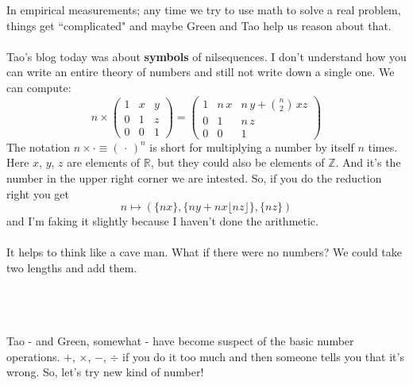 \documentclass[12pt]{article}
\begin{document}
\newpage

\noindent In empirical measurements; any time we try to use math to solve a real problem, things get ``complicated" and maybe Green and Tao help us reason about that. \\ \\
Tao's blog today was about \textbf{symbols} of nilsequences.  I don't understand how you can write an entire theory of numbers and still not write down a single one.  We can compute:
$$ n \times  \left( \begin{array}{ccc} 
1 & x & y \\ 0 & 1 & z \\ 0 & 0 & 1 \end{array} \right)
 = \left( \begin{array}{ccl} 
1 & n \, x & n\, y + \binom{n}{2} \, x z\\ 0 & 1 & n \, z \\ 0 & 0 & 1 \end{array} \right) $$
The notation $n \times \cdot \equiv (\,\cdot \,)^n$ is short for multiplying a number by itself $n$ times.  Here $x$, $y$, $z$ are elements of $\mathbb{R}$, but they could also be elements of $\mathbb{Z}$.  And it's the number in the upper right corner we are intested.  So, if you do the reduction right you get 
$$ n \mapsto ( \{ n x \} , \{ ny + nx \lfloor nz \rfloor \} , \{ n z\} ) $$
and I'm faking it slightly because I haven't done the arithmetic.  \\ \\
It helps to think like a cave man.  What if there were no numbers?  We could take two lengths and add them. \\ \\
 \\ \\
Tao - and Green, somewhat - have become suspect of the basic number operations.  $+$, $\times$, $-$, $\div$ if you do it too much and then someone tells you that it's wrong. So, let's try  new kind of number!
\end{document}
